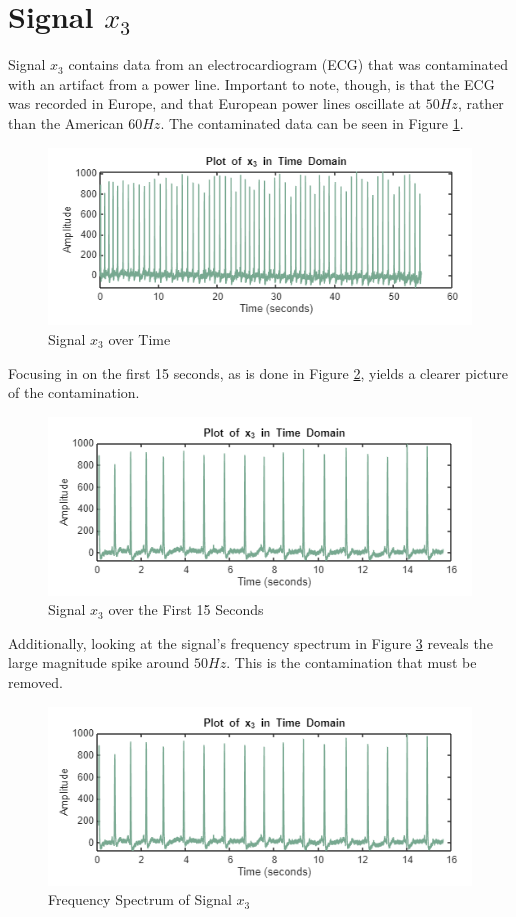 
\section{Signal $x_3$}

Signal $x_3$ contains data from an electrocardiogram (ECG) that was contaminated with an artifact from a power line.  Important to note, though, is that the ECG was recorded in Europe, and that European power lines oscillate at $50 \unit{Hz}$, rather than the American $60 \unit{Hz}$.  The contaminated data can be seen in Figure \ref{fig:x3}.

\begin{figure}[H]
    \centering
    \includegraphics[width=0.5\linewidth]{figures/x3.png}
    \caption{Signal $x_3$ over Time}
    \label{fig:x3}
\end{figure}

Focusing in on the first 15 seconds, as is done in Figure \ref{fig:x3_zoom}, yields a clearer picture of the contamination.
\begin{figure}[H]
    \centering
    \includegraphics[width=0.5\linewidth]{figures/x3_prefilter.png}
    \caption{Signal $x_3$ over the First 15 Seconds}
    \label{fig:x3_zoom}
\end{figure}

Additionally, looking at the signal's frequency spectrum in Figure \ref{fig:X3} reveals the large magnitude spike around $50 \unit{Hz}$.  This is the contamination that must be removed.
\begin{figure}[H]
    \centering
    \includegraphics[width=0.5\linewidth]{figures/X3_prefilter.png}
    \caption{Frequency Spectrum of Signal $x_3$}
    \label{fig:X3}
\end{figure}


